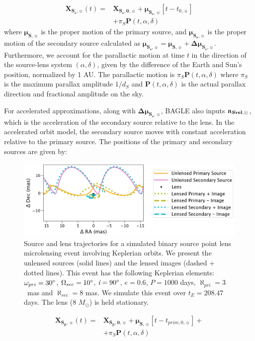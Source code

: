 \documentclass[twocolumn]{aastex701}
\newcommand{\vect}[1]{\boldsymbol{#1}}
\newcommand{\accSsec}{\bold{a}_{\boldsymbol{S\mathrm{rel}},\sun}}
\newcommand{\tnot}{t_{0,\sun}}
\newcommand{\musvec}{\vect{\mu}_{\boldsymbol{S},\sun}}
\newcommand{\mussvec}{\vect{\mu}_{\boldsymbol{S_s},\sun}}
\newcommand{\deltamussvec}{\vect{\Delta\mu}_{\boldsymbol{S_s},\sun}}
\newcommand{\Xspovec}{\vect{X}_{\boldsymbol{S_p,0},\sun}}
\newcommand{\Xssovec}{\vect{X}_{\boldsymbol{S_s,0},\sun}}
\newcommand{\Xspvec}{\vect{X}_{\boldsymbol{S_p},\sun}}
\newcommand{\Xssvec}{\vect{X}_{\boldsymbol{S_s},\sun}}
\newcommand{\tpnot}{t_{prim,0,\sun}}
\newcommand{\w}{\omega_{pri}}
\newcommand{\bigomega}{\Omega_{sec}}
\newcommand{\inclination}{\textit{i}}
\newcommand{\period}{\textit{P}}
\newcommand{\al}{\aleph_{pri}}
\newcommand{\ala}{\aleph_{sec}}
\begin{document}
\begin{align}
    \Xssvec (t) = & \Xssovec + \mussvec [t - \tnot ]\nonumber \\
    &+\pi_S \vect{P}(t, \alpha, \delta)  
    \label{linear_motion2}    
\end{align}
%
where $\musvec$ is the proper motion of the primary source, and $\mussvec$ is the proper motion of the secondary source calculated as $\mussvec = \musvec + \deltamussvec$. Furthermore, we account for the parallactic motion at time $t$ in the direction of the source-lens system $(\alpha, \delta)$, given by the difference of the Earth and Sun's position, normalized by 1 AU.  The parallactic motion is $\pi_S
\vect{P}(t, \alpha, \delta)$ where $\pi_S$ is the
maximum parallax amplitude $1/d_S$ and $\vect{P}(t, \alpha, \delta)$ is the actual parallax direction and fractional amplitude on the sky.

For accelerated approximations, along with $\deltamussvec$, BAGLE also inputs $\accSsec$, which is the acceleration of the secondary source relative to the lens. In the accelerated orbit model, the secondary source moves with constant acceleration relative to the primary source. The positions of the primary and secondary sources are given by: 

\begin{figure}
    \centering
    \includegraphics[width=  \textwidth] {figures/bspl_keplerian.png}
    \caption{Source and lens trajectories for a simulated binary source point lens microlensing event involving Keplerian orbits. We present the unlensed sources (solid lines) and the lensed images (dashed + dotted lines). This event has the following Keplerian elements: $\w = 30 \degree$, $\bigomega = 10 \degree$, $\inclination = 90 \degree$, $e=0.6$, $\period = 1000$ days, $\al = 3  $~mas and $\ala = 8 $ mas. We simulate this event over $t_E=208.47$ days. The lens (8 $M_\odot$) is held stationary.}
    \label{fig:bspl_keplerian}
\end{figure}


\begin{align}
    \Xspvec (t) = & \Xspovec + \musvec [t - \tpnot] \nonumber + \\
    &+\pi_S \vect{P}(t, \alpha, \delta)  
    \label{accelerated motion}    
\end{align}
\end{document}
